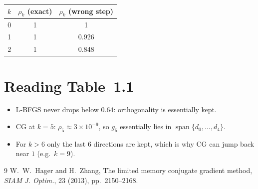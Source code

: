 \documentclass[11pt]{article}
\theoremstyle{definition}
\newcommand{\spn}{\operatorname{span}}
\begin{document}
\begin{center}
\begin{tabular}{@{}ccc@{}}
\toprule
$k$ & $\rho_k$ (exact) & $\rho_k$ (wrong step)\\
\midrule
0 & 1 & 1\\
1 & 1 & 0.926\\
2 & 1 & 0.848\\
\bottomrule
\end{tabular}
\end{center}
\section{Reading Table~1.1}

\begin{itemize}
\item L-BFGS never drops below $0.64$: orthogonality is essentially kept.
\item CG at $k=5$: $\rho_5\approx3\times10^{-9}$, so $g_5$ essentially lies
  in $\spn\{d_0,\dots,d_4\}$.
\item For $k>6$ only the last 6 directions are kept, which is why CG can jump
  back near $1$ (e.g.\ $k=9$).
\end{itemize}

\begin{thebibliography}{9}
 W.~W.~Hager and H.~Zhang, The limited memory conjugate gradient
method, \emph{SIAM J. Optim.}, 23 (2013), pp.~2150--2168.
\end{thebibliography}
\end{document}
